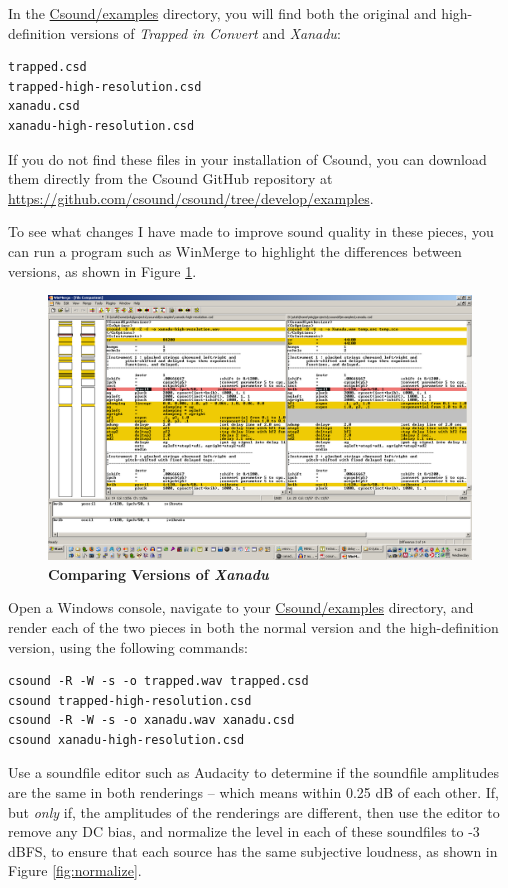 \documentclass[english,11pt,letterpaper,onecolumn]{scrartcl}
\begin{document}
In the \url{Csound/examples} directory, you 
will find both the original and high-definition versions of \emph{Trapped in 
Convert} and  \emph{Xanadu}:

\begin{lstlisting}
trapped.csd
trapped-high-resolution.csd
xanadu.csd
xanadu-high-resolution.csd
\end{lstlisting}

\noindent If you do not find these files in your installation of Csound, you 
can download them directly from the Csound GitHub repository at 
\url{https://github.com/csound/csound/tree/develop/examples}.

To see what changes I have made to improve sound quality in these pieces, you 
can run a program such as WinMerge \cite{winmerge} to highlight the 
differences between versions, as shown in Figure \ref{fig:winmerge}.

\begin{figure}[!htp]
	\centering
		\includegraphics[width=1.0\textwidth]{winmerge.png}
	\caption{\textbf{Comparing Versions of \emph{Xanadu}}}
	\label{fig:winmerge}
\end{figure}

Open a Windows console, navigate to your \url{Csound/examples} directory, and 
render each of the two pieces in both the normal version and the 
high-definition version, using the following commands:

\begin{lstlisting}
csound -R -W -s -o trapped.wav trapped.csd 
csound trapped-high-resolution.csd
csound -R -W -s -o xanadu.wav xanadu.csd
csound xanadu-high-resolution.csd
\end{lstlisting}

Use a soundfile editor such as Audacity \cite{audacity} to determine if the 
soundfile amplitudes are the same in both renderings -- which means within 
0.25 dB of each other. If, but \emph{only} if, the amplitudes of the renderings 
are different, then use the editor to remove any DC bias, and normalize the 
level in each of these soundfiles to -3 dBFS, to ensure that each source has 
the same subjective loudness, as shown in Figure \ref{fig:normalize}. 
\end{document}
